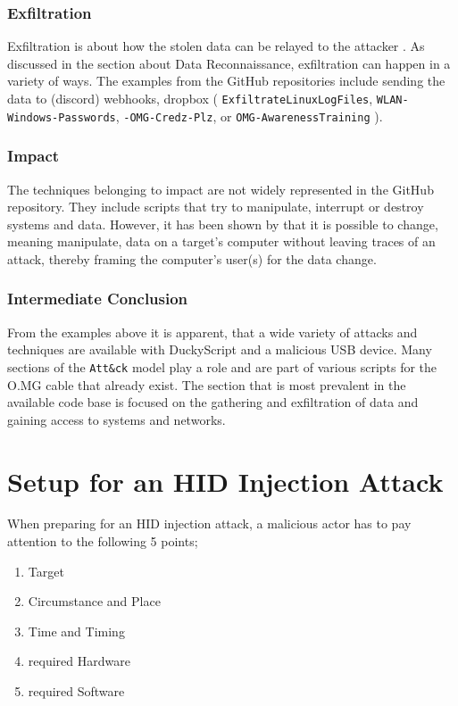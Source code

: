 \subsubsection{Exfiltration}

Exfiltration is about how the stolen data can be relayed to the attacker \cite{MITREATTCK}. As discussed in the section about Data Reconnaissance, exfiltration can happen in a variety of ways. The examples from the GitHub repositories include sending the data to (discord) webhooks, dropbox  ( \verb|ExfiltrateLinuxLogFiles|, \verb|WLAN-Windows-Passwords|, \verb|-OMG-Credz-Plz|, or \verb|OMG-AwarenessTraining|  \cite{OmgpayloadsPayloadsLibrary}).

\subsubsection{Impact}

The techniques belonging to impact are not widely represented in the GitHub repository. They include scripts that try to manipulate, interrupt or destroy systems and data. However, it has been shown by \cite{lawalFacilitatingCyberenabledFraud2022} that it is possible to change, meaning manipulate, data on a target's computer without leaving traces of an attack, thereby framing the computer's user(s) for the data change. \cite{MITREATTCK}


\subsubsection{Intermediate Conclusion}

From the examples above it is apparent, that a wide variety of attacks and techniques are available with DuckyScript and a malicious USB device. Many sections of the \verb|Att&ck| model play a role and are part of various scripts for the O.MG cable that already exist. The section that is most prevalent in the available code base is focused on the gathering and exfiltration of data and gaining access to systems and networks. 


\section{Setup for an HID Injection Attack}

When preparing for an HID injection attack, a malicious actor has to pay attention to the following 5 points;
\begin{enumerate}
    \item Target
    \item Circumstance and Place
    \item Time and Timing
    \item required Hardware
    \item required Software
\end{enumerate}


